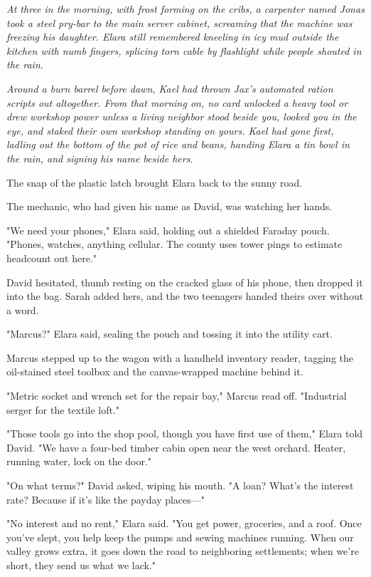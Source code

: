 \textit{At three in the morning, with frost forming on the cribs, a carpenter named Jonas took a steel pry-bar to the main server cabinet, screaming that the machine was freezing his daughter. Elara still remembered kneeling in icy mud outside the kitchen with numb fingers, splicing torn cable by flashlight while people shouted in the rain.}

\textit{Around a burn barrel before dawn, Kael had thrown Jax's automated ration scripts out altogether. From that morning on, no card unlocked a heavy tool or drew workshop power unless a living neighbor stood beside you, looked you in the eye, and staked their own workshop standing on yours. Kael had gone first, ladling out the bottom of the pot of rice and beans, handing Elara a tin bowl in the rain, and signing his name beside hers.}

\bigskip

The snap of the plastic latch brought Elara back to the sunny road.

The mechanic, who had given his name as David, was watching her hands.

"We need your phones," Elara said, holding out a shielded Faraday pouch. "Phones, watches, anything cellular. The county uses tower pings to estimate headcount out here."

David hesitated, thumb resting on the cracked glass of his phone, then dropped it into the bag. Sarah added hers, and the two teenagers handed theirs over without a word.

"Marcus?" Elara said, sealing the pouch and tossing it into the utility cart.

Marcus stepped up to the wagon with a handheld inventory reader, tagging the oil-stained steel toolbox and the canvas-wrapped machine behind it.

"Metric socket and wrench set for the repair bay," Marcus read off. "Industrial serger for the textile loft."

"Those tools go into the shop pool, though you have first use of them," Elara told David. "We have a four-bed timber cabin open near the west orchard. Heater, running water, lock on the door."

"On what terms?" David asked, wiping his mouth. "A loan? What's the interest rate? Because if it's like the payday places—"

"No interest and no rent," Elara said. "You get power, groceries, and a roof. Once you've slept, you help keep the pumps and sewing machines running. When our valley grows extra, it goes down the road to neighboring settlements; when we're short, they send us what we lack."

